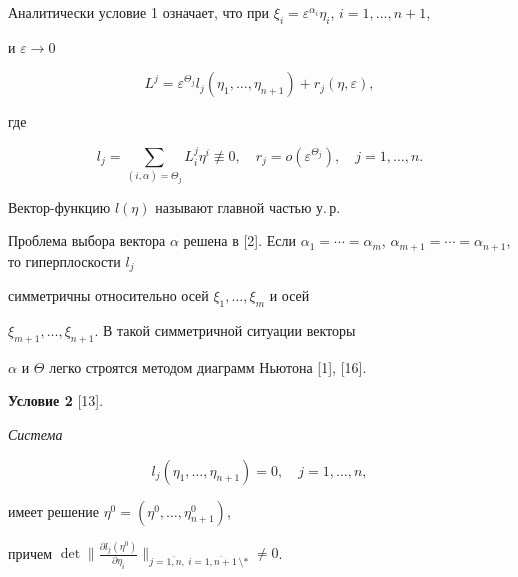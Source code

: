 \medskip





Аналитически условие 1 означает, что при $\xi_i =


\varepsilon^{\alpha_i}\eta_i$, $i=1,\dotsc,n+1$,


и $\varepsilon\rightarrow 0$


\begin{equation}


L^j = \varepsilon^{\Theta_j}l_j(\eta_1,\dotsc,\eta_{n+1}) +


r_j(\eta,\varepsilon),


\end{equation}


где


$$


l_j = \sum_{(i,\alpha)=\Theta_j}L_i^j\eta^i\not\equiv 0, \quad


r_j=o(\varepsilon^{\Theta_j}), \quad j=1,\dotsc,n.


$$


Вектор-функцию $l(\eta)$ называют главной частью у.\,р.





Проблема выбора вектора $\alpha$ решена в [2]. Если $\alpha_1 =\dotsb


=\alpha_m$, $\alpha_{m+1}=\dotsb =\alpha_{n+1}$, то гиперплоскости $l_j$


симметричны относительно осей $\xi_1,\dotsc,\xi_m$  и осей


$\xi_{m+1},\dotsc,\xi_{n+1}$.   В такой симметричной ситуации векторы


$\alpha$  и $\Theta$  легко строятся методом диаграмм Ньютона [1], [16].


\medskip





{\bf Условие 2} [13]. {\it Система


\begin{equation}


l_j(\eta_1,\dotsc,\eta_{n+1}) = 0, \quad j=1,\dotsc,n,


\end{equation}


имеет решение $\eta^0 = (\eta^0,\dotsc,\eta^0_{n+1})$,


причем $\det\big\|\frac{\partial


l_j(\eta^0)}{\partial\eta_i}\big\|_{j=\overline{1,n},


\ i=\overline{1,n+1}\,\setminus *} \ne 0$.}


